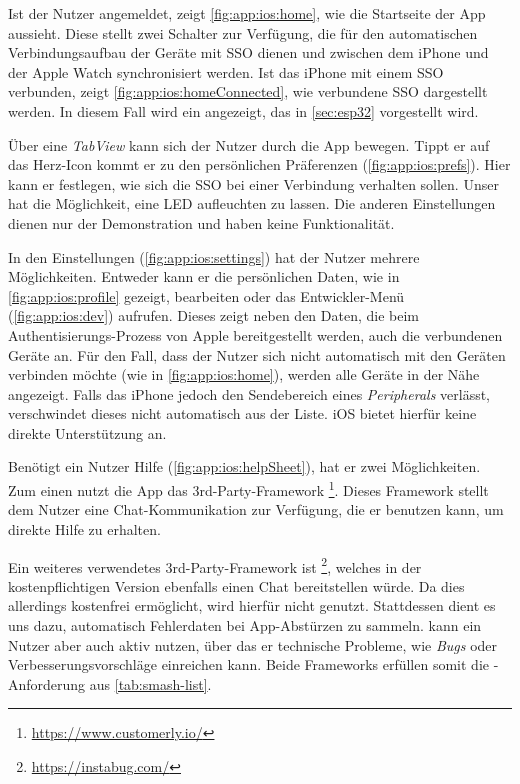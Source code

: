 Ist der Nutzer angemeldet, zeigt \autoref{fig:app:ios:home}, wie die Startseite der App aussieht. Diese stellt zwei Schalter zur Verfügung, die für den automatischen Verbindungsaufbau der Geräte mit \ac{SSO} dienen und zwischen dem iPhone und der Apple Watch synchronisiert werden. Ist das iPhone mit einem \ac{SSO} verbunden, zeigt \autoref{fig:app:ios:homeConnected}, wie verbundene \ac{SSO} dargestellt werden. In diesem Fall wird ein  angezeigt, das in \autoref{sec:esp32}  vorgestellt wird.

Über eine \emph{TabView} kann sich der Nutzer durch die App bewegen. Tippt er auf das Herz-Icon kommt er zu den persönlichen Präferenzen (\autoref{fig:app:ios:prefs}). Hier kann er festlegen, wie sich die \ac{SSO} bei einer Verbindung verhalten sollen. Unser  hat die Möglichkeit, eine LED aufleuchten zu lassen. Die anderen Einstellungen dienen nur der Demonstration und haben keine Funktionalität.

In den Einstellungen (\autoref{fig:app:ios:settings}) hat der Nutzer mehrere Möglichkeiten. Entweder kann er die persönlichen Daten, wie in \autoref{fig:app:ios:profile} gezeigt, bearbeiten oder das Entwickler-Menü (\autoref{fig:app:ios:dev}) aufrufen. Dieses zeigt neben den Daten, die beim Authen\-tisierungs-Prozess von Apple bereitgestellt werden, auch die verbundenen Geräte an. Für den Fall, dass der Nutzer sich nicht automatisch mit den Geräten verbinden möchte (wie in \autoref{fig:app:ios:home}), werden alle Geräte in der Nähe angezeigt. Falls das iPhone jedoch den Sendebereich eines \emph{Peripherals} verlässt, verschwindet dieses nicht automatisch aus der Liste. iOS bietet hierfür keine direkte Unterstützung an.

Benötigt ein Nutzer Hilfe (\autoref{fig:app:ios:helpSheet}), hat er zwei Möglichkeiten. Zum einen nutzt die App das 3rd-Party-Framework \footnote{\url{https://www.customerly.io/}}. Dieses Framework stellt dem Nutzer eine Chat-Kommunikation zur Verfügung, die er benutzen kann, um direkte Hilfe zu erhalten.

Ein weiteres verwendetes 3rd-Party-Framework ist \footnote{\url{https://instabug.com/}}, welches in der kostenpflichtigen Version ebenfalls einen Chat bereitstellen würde. Da  dies allerdings kostenfrei ermöglicht, wird  hierfür nicht genutzt. Stattdessen dient es uns dazu, automatisch Fehlerdaten bei App-Abstürzen zu sammeln.  kann ein Nutzer aber auch aktiv nutzen, über das er technische Probleme, wie \emph{Bugs} oder Verbesserungsvorschläge einreichen kann. Beide Frameworks erfüllen somit die -Anforderung aus \autoref{tab:smash-list}.

